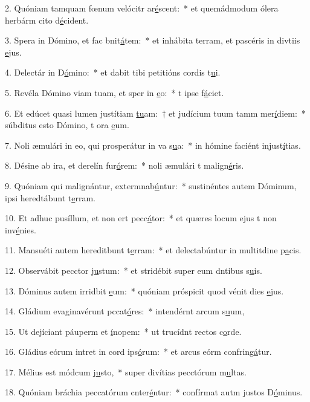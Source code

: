 2. Quóniam tamquam fœnum velócitr ar\uline{é}scent:~* et quemádmodum ólera herbárm cito d\uline{é}cident.\par 
3. Spera in Dómino, et fac bnit\uline{á}tem:~* et inhábita terram, et pascéris in divtiis \uline{e}jus.\par 
4. Delectár in D\uline{ó}mino:~* et dabit tibi petitións cordis t\uline{u}i.\par 
5. Revéla Dómino viam tuam, et sper in \uline{e}o:~* t ipse f\uline{á}ciet.\par 
6. Et edúcet quasi lumen justítiam \uline{tu}am:~† et judícium tuum tamm mer\uline{í}diem:~* súbditus esto Dómino, t ora \uline{e}um.\par 
7. Noli æmulári in eo, qui prosperátur in va s\uline{u}a:~* in hómine faciént injust\uline{í}tias.\par 
8. Désine ab ira, et derelín fur\uline{ó}rem:~* noli æmulári t malign\uline{é}ris.\par 
9. Quóniam qui malignántur, extermnab\uline{ú}ntur:~* sustinéntes autem Dóminum, ipsi heredtábunt t\uline{e}rram.\par 
10. Et adhuc pusíllum, et non ert pecc\uline{á}tor:~* et quæres locum ejus t non inv\uline{é}nies.\par 
11. Mansuéti autem hereditbunt t\uline{e}rram:~* et delectabúntur in multitdine p\uline{a}cis.\par 
12. Observábit pecctor j\uline{u}stum:~* et stridébit super eum dntibus s\uline{u}is.\par 
13. Dóminus autem irridbit \uline{e}um:~* quóniam próspicit quod vénit dies \uline{e}jus.\par 
14. Gládium evaginavérunt pccat\uline{ó}res:~* intendérnt arcum s\uline{u}um,\par 
15. Ut dejíciant páuperm et \uline{í}nopem:~* ut trucídnt rectos c\uline{o}rde.\par 
16. Gládius eórum intret in cord ips\uline{ó}rum:~* et arcus eórm confring\uline{á}tur.\par 
17. Mélius est módcum j\uline{u}sto,~* super divítias pecctórum m\uline{u}ltas.\par 
18. Quóniam bráchia peccatórum cnter\uline{é}ntur:~* confírmat autm justos D\uline{ó}minus.\par 
